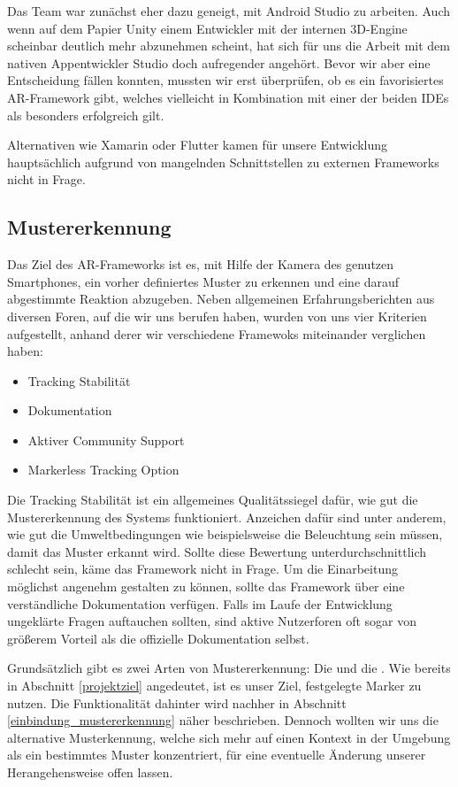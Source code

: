 Das Team war zunächst eher dazu geneigt, mit Android Studio zu arbeiten. Auch wenn auf dem Papier Unity einem Entwickler mit der internen 3D-Engine scheinbar deutlich mehr abzunehmen scheint, hat sich für uns die Arbeit mit dem nativen Appentwickler Studio doch aufregender angehört. Bevor wir aber eine Entscheidung fällen konnten, mussten wir erst überprüfen, ob es ein favorisiertes AR-Framework gibt, welches vielleicht in Kombination mit einer der beiden IDEs als besonders erfolgreich gilt.

Alternativen wie Xamarin oder Flutter kamen für unsere Entwicklung hauptsächlich aufgrund von mangelnden Schnittstellen zu externen Frameworks nicht in Frage.
\subsection{Mustererkennung}
Das Ziel des AR-Frameworks ist es, mit Hilfe der Kamera des genutzen Smartphones, ein vorher definiertes Muster zu erkennen und eine darauf abgestimmte Reaktion abzugeben. Neben allgemeinen Erfahrungsberichten aus diversen Foren, auf die wir uns berufen haben, wurden von uns vier Kriterien aufgestellt, anhand derer wir verschiedene Framewoks miteinander verglichen haben:
\begin{itemize}
\item Tracking Stabilität
\item Dokumentation
\item Aktiver Community Support
\item Markerless Tracking Option
\end{itemize}
Die Tracking Stabilität ist ein allgemeines Qualitätssiegel dafür, wie gut die Mustererkennung des Systems funktioniert. Anzeichen dafür sind unter anderem, wie gut die Umweltbedingungen wie beispielsweise die Beleuchtung sein müssen, damit das Muster erkannt wird. Sollte diese Bewertung unterdurchschnittlich schlecht sein, käme das Framework nicht in Frage.
Um die Einarbeitung möglichst angenehm gestalten zu können, sollte das Framework über eine verständliche Dokumentation verfügen.
Falls im Laufe der Entwicklung ungeklärte Fragen auftauchen sollten, sind aktive Nutzerforen oft sogar von größerem Vorteil als die offizielle Dokumentation selbst. 

Grundsätzlich gibt es zwei Arten von Mustererkennung: Die  und die . Wie bereits in Abschnitt \ref{projektziel} angedeutet, ist es unser Ziel, festgelegte Marker zu nutzen. Die Funktionalität dahinter wird nachher in Abschnitt \ref{einbindung_mustererkennung} näher beschrieben. Dennoch wollten wir uns die alternative  Musterkennung, welche sich mehr auf einen Kontext in der Umgebung als ein bestimmtes Muster konzentriert, für eine eventuelle Änderung unserer Herangehensweise offen lassen.

